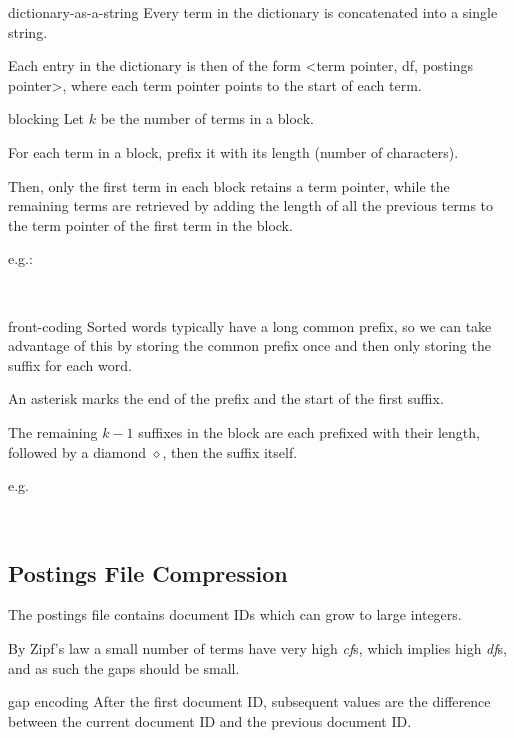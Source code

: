 \begin{defn}{dictionary-as-a-string}
    Every term in the dictionary is concatenated into a single string.

    Each entry in the dictionary is then of the form <term pointer, df, postings pointer>, where each term pointer points to the start of each term.
\end{defn}

\begin{defn}{blocking}
    Let $k$ be the number of terms in a block.
    
    For each term in a block, prefix it with its length (number of characters).

    Then, only the first term in each block retains a term pointer, while the remaining terms are retrieved by adding the length of all the previous terms to the term pointer of the first term in the block.

    e.g.:

     \\
\end{defn}

\begin{defn}{front-coding}
    Sorted words typically have a long common prefix, so we can take advantage of this by storing the common prefix once and then only storing the suffix for each word.

    An asterisk \code{*} marks the end of the prefix and the start of the first suffix.

    The remaining $k - 1$ suffixes in the block are each prefixed with their length, followed by a diamond $\diamond$, then the suffix itself.

    e.g.

     \\
\end{defn}

\subsection{Postings File Compression}
The postings file contains document IDs which can grow to large integers.

By Zipf's law a small number of terms have very high \textit{cf}s, which implies high \textit{df}s, and as such the gaps should be small.

\begin{defn}{gap encoding}
    After the first document ID, subsequent values are the difference between the current document ID and the previous document ID.
\end{defn}

